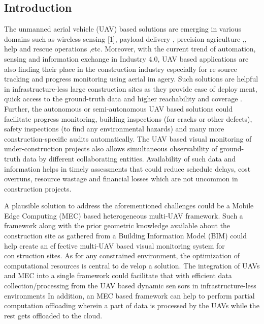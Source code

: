 \documentclass{article}
\begin{document}
\begin{multicols}{2}
\section{Introduction}
The unmanned aerial vehicle (UAV) based solutions are
emerging in various domains such as wireless sensing [1],
payload delivery \cite{ruggiero2018aerial}, precision agriculture \cite{boursianis2020internet},, help and
rescue operations  \cite{waharte2010supporting},etc.    Moreover, with the current
trend of automation, sensing and information exchange in Industry 4.0, UAV based applications are also finding
their place in the construction industry especially for resource tracking and progress monitoring using aerial imagery. Such solutions are helpful in infrastructure-less
large construction sites as they provide ease of deployment, quick access to the ground-truth data and higher
reachability and coverage \cite{hamledari2018uav}.  Further, the autonomous
or semi-autonomous UAV based solutions could facilitate
progress monitoring, building inspections (for cracks or
other defects), safety inspections (to find any environmental hazards) and many more construction-specific audits automatically. The UAV based visual monitoring of
under-construction projects also allows simultaneous observability of ground-truth data by different collaborating
entities. Availability of such data and information helps
in timely assessments that could reduce schedule delays,
cost overruns, resource wastage and financial losses which
are not uncommon in construction projects.



A plausible solution to address the aforementioned
challenges could be a Mobile Edge Computing (MEC) \cite{mao2017survey} based heterogeneous multi-UAV framework. Such a
framework along with the prior geometric knowledge available about the construction site as gathered from a Building Information Model (BIM) \cite{golparvar2011integrated} could help create an effective multi-UAV based visual monitoring system for construction sites. As for any constrained environment, the
optimization of computational resources is central to develop a solution. The integration of UAVs and MEC into
a single framework could facilitate that with efficient data
collection/processing from the UAV based dynamic sensors in infrastructure-less environments \cite{nguyen2020towards} In addition,
an MEC based framework can help to perform partial
computation offloading wherein a part of data is processed
by the UAVs while the rest gets offloaded to the cloud.




\end{multicols}
\end{document}
